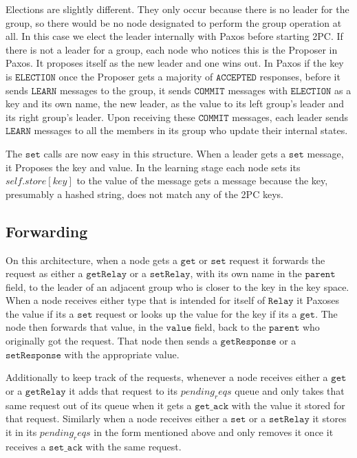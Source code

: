 \documentclass{amsart}
\theoremstyle{definition}
\theoremstyle{remark}
\numberwithin{equation}{section}
\begin{document}
Elections are slightly different. They only occur because there is no leader for the group, so there would be no node designated to perform the group operation at all. In this case we elect the leader internally with Paxos before starting 2PC. If there is not a leader for a group, each node who notices this is the Proposer in Paxos. It proposes itself as the new leader and one wins out. In Paxos if the key is $\mathtt{ELECTION}$ once the Proposer gets a majority of $\mathtt{ACCEPTED}$ responses, before it sends $\mathtt{LEARN}$ messages to the group, it sends $\mathtt{COMMIT}$ messages with $\mathtt{ELECTION}$ as a key and its own name, the new leader, as the value to its left group's leader and its right group's leader. Upon receiving these $\mathtt{COMMIT}$ messages, each leader sends $\mathtt{LEARN}$ messages to all the members in its group who update their internal states.

The $\mathtt{set}$ calls are now easy in this structure. When a leader gets a $\mathtt{set}$ message, it Proposes the key and value. In the learning stage each node sets its $self.store[key]$ to the value of the message gets a message because the key, presumably a hashed string, does not match any of the 2PC keys.
\subsection{Forwarding}
On this architecture, when a node gets a $\mathtt{get}$ or $\mathtt{set}$ request it forwards the request as either a $\mathtt{getRelay}$ or a $\mathtt{setRelay}$, with its own name in the $\mathtt{parent}$ field, to the leader of an adjacent group who is closer to the key in the key space. When a node receives either type that is intended for itself of $\mathtt{Relay}$ it Paxoses the value if its a $\mathtt{set}$ request or looks up the value for the key if its a $\mathtt{get}$. The node then forwards that value, in the $\mathtt{value}$ field, back to the $\mathtt{parent}$ who originally got the request. That node then sends a $\mathtt{getResponse}$ or a $\mathtt{setResponse}$ with the appropriate value.

Additionally to keep track of the requests, whenever a node receives either a $\mathtt{get}$ or a $\mathtt{getRelay}$ it adds that request to its $pending_reqs$ queue and only takes that same request out of its queue when it gets a $\mathtt{get\_ack}$ with the value it stored for that request. Similarly when a node receives either a $\mathtt{set}$ or a $\mathtt{setRelay}$ it stores it in its $pending_reqs$ in the form mentioned above and only removes it once it receives a $\mathtt{set\_ack}$ with the same request.
\end{document}
